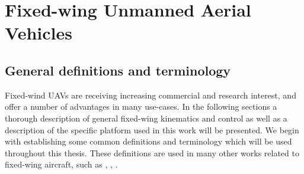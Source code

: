 
\chapter{Fixed-wing Unmanned Aerial Vehicles}\label{cha:fixed_wing_uav}
\section{General definitions and terminology}
Fixed-wind UAVs are receiving increasing commercial and research interest, and offer a number of advantages in many use-cases. In the following sections a thorough description of
general fixed-wing kinematics and control as well as a description of the specific platform used in this work will be presented. 
We begin with establishing some common definitions and terminology which will be used throughout this thesis. These definitions are 
 used in many other works related to fixed-wing aircraft, such as \cite{uav_dynamics_wind}, \cite{uav_dynamics_modeling}, 
\cite{fighter_aircraft_mpc}. 

